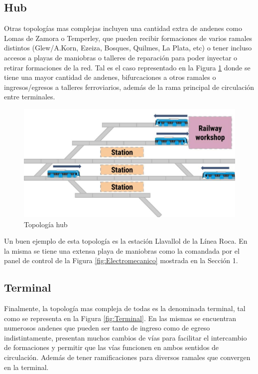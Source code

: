 	\subsection{Hub}
	
		Otras topologías mas complejas incluyen una cantidad extra de andenes como Lomas de Zamora o Temperley, que pueden recibir formaciones de varios ramales distintos (Glew/A.Korn, Ezeiza, Bosques, Quilmes, La Plata, etc) o tener incluso accesos a playas de maniobras o talleres de reparación para poder inyectar o retirar formaciones de la red. Tal es el caso representado en la Figura \ref{fig:Hub} donde se tiene una mayor cantidad de andenes, bifurcaciones a otros ramales o ingresos/egresos a talleres ferroviarios, además de la rama principal de circulación entre terminales. 
		
			\begin{figure}[h]
			\centering
				\includegraphics[scale=.45]{./Figures/Hub}
				\caption{Topología hub}
				\label{fig:Hub}
			\end{figure}
	
		Un buen ejemplo de esta topología es la estación Llavallol de la Línea Roca. En la misma se tiene una extensa playa de maniobras como la comandada por el panel de control de la Figura \ref{fig:Electromecanico} mostrada en la Sección 1.
		
	\subsection{Terminal}
		
		Finalmente, la topología mas compleja de todas es la denominada terminal, tal como se representa en la Figura \ref{fig:Terminal}. En las mismas se encuentran numerosos andenes que pueden ser tanto de ingreso como de egreso indistintamente, presentan muchos cambios de vías para facilitar el intercambio de formaciones y permitir que las vías funcionen en ambos sentidos de circulación. Además de tener ramificaciones para diversos ramales que convergen en la terminal.
		
